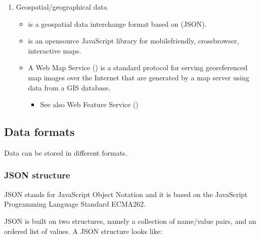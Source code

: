 \documentclass[a4paper,12pt,english]{sphinxhowto}
\begin{document}
\begin{enumerate}
\item {} 
Geospatial/geographical data
\begin{itemize}
\item {} 
 is a geospatial data interchange format based on  (JSON).

\item {} 
 is an open\sphinxhyphen{}source JavaScript library for mobile\sphinxhyphen{}friendly, cross\sphinxhyphen{}browser, interactive maps.

\item {} 
A Web Map Service () is a standard protocol for serving georeferenced map images over the Internet that are generated by a map server using data from a GIS database.
\begin{itemize}
\item {} 
See also Web Feature Service ()

\end{itemize}

\end{itemize}

\end{enumerate}


\ignorespaces 

\subsection{Data formats}
\label{\detokenize{DDHH:data-formats}}\label{\detokenize{DDHH:index-0}}
Data can be stored in different formats.



\subsubsection{JSON structure}
\label{\detokenize{DDHH:json-structure}}\label{\detokenize{DDHH:json-str}}
JSON stands for JavaScript Object Notation and it is based on the JavaScript Programming Language Standard ECMA\sphinxhyphen{}262.

JSON is built on two structures, namely a collection of name/value pairs, and an ordered list of values.
A JSON structure looks like:
\begin{quote}

\begin{sphinxVerbatim}[commandchars=\\\{\},formatcom=\footnotesize]
 
         
          \PYG{p}{[}
            
                    
        \PYG{p}{]}
\end{sphinxVerbatim}
\end{quote}
\end{document}
